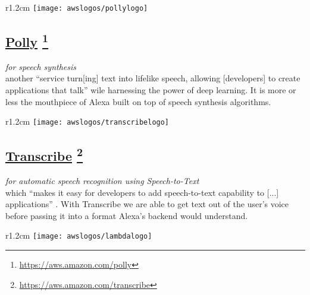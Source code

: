 %	
\begin{wrapfigure}[2]{r}{1.2cm}
		\texttt{[image: awslogos/pollylogo]}
\end{wrapfigure}



\subsection*{
\href{https://aws.amazon.com/polly/}{\textbf{Polly}} \footnote{\url{https://aws.amazon.com/polly}}
}
\textit{for speech synthesis\\}
	another ``service turn[ing] text into lifelike speech, allowing [developers] to create applications that talk'' \cite{aws_website} wile harnessing the power of deep learning. It is more or less the mouthpiece of Alexa built on top of speech synthesis algorithms.
	

	
	\begin{wrapfigure}[2]{r}{1.2cm}
		\texttt{[image: awslogos/transcribelogo]}
	\end{wrapfigure}
	
	
	\subsection*{
		\href{https://aws.amazon.com/transcribe/}{\textbf{Transcribe}} \footnote{\url{https://aws.amazon.com/transcribe}}
} 
		\textit{for automatic speech recognition using Speech-to-Text}\\
	which ``makes it easy for developers to add speech-to-text capability to [...] applications'' \cite{aws_website}. With Transcribe we are able to get text out of the user's voice before passing it into a format Alexa's backend would understand.
	
	
	
	\begin{wrapfigure}[2]{r}{1.2cm}
		\texttt{[image: awslogos/lambdalogo]}
	\end{wrapfigure}
	
